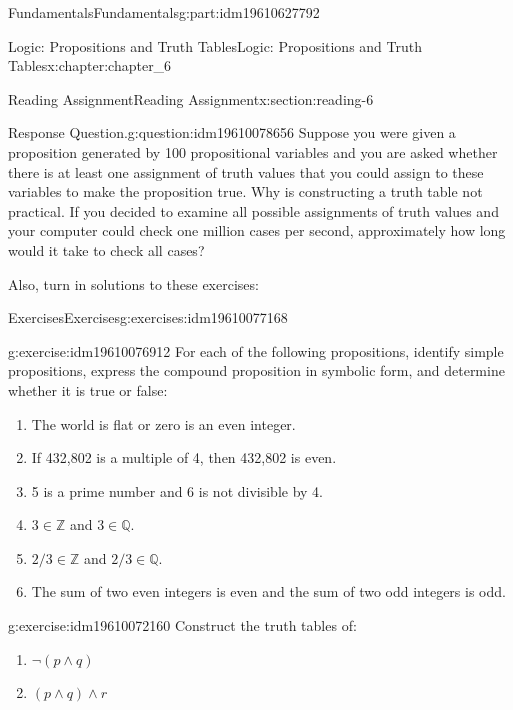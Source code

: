 \documentclass[oneside,10pt,]{book}
\numberwithin{equation}{section}
\begin{document}
\begin{partptx}{Fundamentals}{}{Fundamentals}{}{}{g:part:idm19610627792}
\begin{chapterptx}{Logic: Propositions and Truth Tables}{}{Logic: Propositions and Truth Tables}{}{}{x:chapter:chapter_6}
\begin{sectionptx}{Reading Assignment}{}{Reading Assignment}{}{}{x:section:reading-6}
\begin{question}{Response Question.}{g:question:idm19610078656}%
Suppose you were given a proposition generated by 100 propositional variables and you are asked whether there is at least one assignment of truth values that you could assign to these variables to make the proposition true. Why is constructing a truth table not practical.  If you decided to examine all possible assignments of truth values and your computer could check one million cases per second, approximately how long would it take to check all cases?%
\end{question}
Also, turn in solutions to these exercises:%
%
%
\typeout{************************************************}
\typeout{************************************************}
%
\begin{exercises-subsection-numberless}{Exercises}{}{Exercises}{}{}{g:exercises:idm19610077168}
\par\medskip\noindent%
%
\begin{exercisegroup}
\begin{divisionexerciseeg}{1}{}{}{g:exercise:idm19610076912}%
For each of the following propositions, identify simple propositions, express the compound proposition in symbolic form, and determine whether it is true or false:%
\par
%
\begin{enumerate}[label=(\alph*)]
\item{}The world is flat or zero is an even integer.%
\item{}If 432,802 is a multiple of 4, then 432,802 is even.%
\item{}5 is a prime number and 6 is not divisible by 4.%
\item{}\(3 \in \mathbb{Z}\) and \(3 \in  \mathbb{Q}\).%
\item{}\(2/3 \in  \mathbb{Z}\) and \(2/3 \in  \mathbb{Q}\).%
\item{}The sum of two even integers is even and the sum of two odd integers is odd.%
\end{enumerate}
%
\end{divisionexerciseeg}%
\begin{divisionexerciseeg}{2}{}{}{g:exercise:idm19610072160}%
Construct the truth tables of:%
\begin{multicols}{2}
\begin{enumerate}[label=(\alph*)]
\item{}\(\displaystyle \neg (p\land  q )\)%
\item{}\(\displaystyle (p \land q)\land r\)%

\end{enumerate}
\end{multicols}
\end{divisionexerciseeg}
\end{exercisegroup}
\end{exercises-subsection-numberless}
\end{sectionptx}
\end{chapterptx}
\end{partptx}
\end{document}
